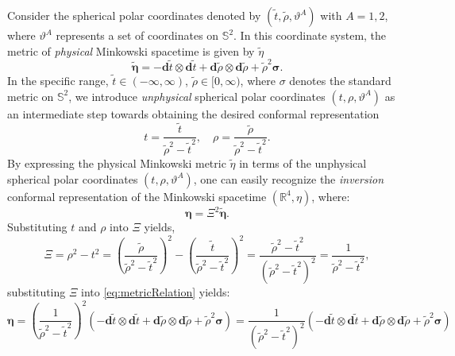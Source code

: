Consider the spherical polar coordinates denoted by $(\tilde{t}, \tilde{\rho}, \vartheta^A)$ with $A = 1, 2$, where $\vartheta^A$ represents a set of coordinates on $\mathbb{S}^2$. In this coordinate system, the metric of \textit{physical} Minkowski spacetime is given by $\tilde{\eta}$
\begin{equation}\label{eq:physicalMikmetric}
\tilde{\boldsymbol{\eta}}=-\mathbf{d} \tilde{t} \otimes \mathbf{d} \tilde{t}+\mathbf{d} \tilde{\rho} \otimes \mathbf{d} \tilde{\rho}+\tilde{\rho}^2 \boldsymbol{\sigma}.
\end{equation}
In the specific range, $\tilde{t} \in (-\infty, \infty)$, $\tilde{\rho} \in [0, \infty)$, where $\sigma$ denotes the standard metric on $\mathbb{S}^2$, we introduce \textit{unphysical} spherical polar coordinates $(t, \rho, \vartheta^A)$ as an intermediate step towards obtaining the desired conformal representation
\begin{equation}\label{eq:unphysicalCoords}
t=\frac{\tilde{t}}{\tilde{\rho}^2-\tilde{t}^2}, \quad \rho=\frac{\tilde{\rho}}{\tilde{\rho}^2-\tilde{t}^2}.
\end{equation}
By expressing the physical Minkowski metric $\tilde{\eta}$ in terms of the unphysical spherical polar coordinates $(t, \rho, \vartheta^A)$, one can easily recognize the \textit{inversion} conformal representation of the Minkowski spacetime $(\mathbb{R}^4, \eta)$, where:
\begin{equation}\label{eq:metricRelation}
  \boldsymbol{\eta} = \Xi^2 \boldsymbol{\tilde{\eta}}.
\end{equation}
Substituting $t$ and $\rho$ into $\Xi$ yields,
\begin{equation}\label{eq:Xi}
  \Xi= \rho^2 - t^2 = \left(\frac{\tilde{\rho}}{\tilde{\rho}^2-\tilde{t}^2}\right)^2 - \left(\frac{\tilde{t}}{\tilde{\rho}^2-\tilde{t}^2}\right)^2 = \frac{\tilde{\rho}^2 - \tilde{t}^2}{(\tilde{\rho}^2-\tilde{t}^2)^2} = \frac{1}{\tilde{\rho}^2 - \tilde{t}^2},
\end{equation}
substituting $\Xi$ into \eqref{eq:metricRelation} yields:
\begin{equation}\label{eq:Unphysicalspacetimemetric}
  \boldsymbol{\eta} = \left(\frac{1}{\tilde{\rho}^2 - \tilde{t}^2}\right)^2 (-\mathbf{d} \tilde{t} \otimes \mathbf{d} \tilde{t}+\mathbf{d} \tilde{\rho} \otimes \mathbf{d} \tilde{\rho}+\tilde{\rho}^2 \boldsymbol{\sigma}) = \frac{1}{(\tilde{\rho}^2 - \tilde{t}^2)^2} (-\mathbf{d} \tilde{t} \otimes \mathbf{d} \tilde{t}+\mathbf{d} \tilde{\rho} \otimes \mathbf{d} \tilde{\rho}+\tilde{\rho}^2 \boldsymbol{\sigma})
\end{equation}
